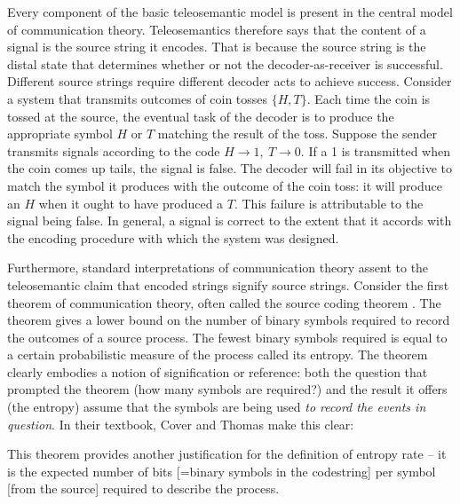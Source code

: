 

Every component of the basic teleosemantic model is present in the central model of communication theory.
Teleosemantics therefore says that the content of a signal is the source string it encodes.
That is because the source string is the distal state that determines whether or not the decoder-as-receiver is successful.
Different source strings require different decoder acts to achieve success.
Consider a system that transmits outcomes of coin tosses $\{H,T\}$.
Each time the coin is tossed at the source, the eventual task of the decoder is to produce the appropriate symbol $H$ or $T$ matching the result of the toss.
Suppose the sender transmits signals according to the code $H\rightarrow1,\ T\rightarrow0$.
If a 1 is transmitted when the coin comes up tails, the signal is false.
The decoder will fail in its objective to match the symbol it produces with the outcome of the coin toss: it will produce an $H$ when it ought to have produced a $T$.
This failure is attributable to the signal being false.
In general, a signal is correct to the extent that it accords with the encoding procedure with which the system was designed.

Furthermore, standard interpretations of communication theory assent to the teleosemantic claim that encoded strings signify source strings.
Consider the first theorem of communication theory, often called the source coding theorem \citep[$\S$5]{cover2006elements} \citep[$\S$4]{mackay2003information}.
The theorem gives a lower bound on the number of binary symbols required to record the outcomes of a source process.
The fewest binary symbols required is equal to a certain probabilistic measure of the process called its entropy.
The theorem clearly embodies a notion of signification or reference: both the question that prompted the theorem (how many symbols are required?) and the result it offers (the entropy) assume that the symbols are being used \emph{to record the events in question}.
In their textbook, Cover and Thomas make this clear:

\begin{myquote}
This theorem provides another justification for the definition of entropy rate -- it is the expected number of bits [=binary symbols in the codestring] per symbol [from the source] required to describe the process.
\par\hspace*{\fill}\citet[115]{cover2006elements}
\end{myquote}

